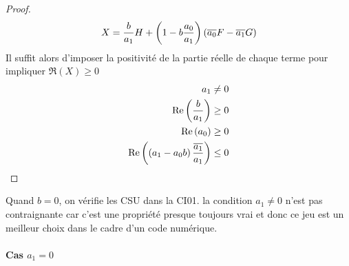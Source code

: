 \begin{proof}
          \begin{equation}
            \label{eq:unicite:form_var:decomp_cgu_ci1_a1}
            X = \dfrac{b}{a_1}H   + \left(1-b\dfrac{a_0}{a_1}\right)\left({\overline{a_0}} F - {\overline{a_1}} G\right)
          \end{equation}
          Il suffit alors d'imposer la positivité de la partie réelle de chaque terme pour impliquer \(\Re(X)\ge0\)
          \begin{align}
            a_1 \not = 0\\
            \operatorname{Re}\left(\dfrac{b}{a_1}\right) \ge 0 \\
            \operatorname{Re}\left(a_0\right) \ge 0 \\
            \operatorname{Re}\left(\left(a_1-a_0 b\right)\dfrac{{\overline{a_1}}}{a_1}\right) \le 0
          \end{align}
        \end{proof}

        Quand \(b=0\), on vérifie les CSU dans la CI01. la condition \(a_1\not=0\) n'est pas contraignante car c'est une propriété presque toujours vrai et donc ce jeu est un meilleur choix dans le cadre d'un code numérique.

      \paragraph{Cas \(a_1=0\)}
        ~
        
